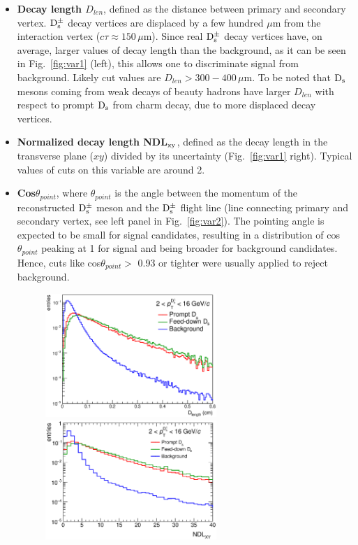 \begin{itemize}
\item \textbf{Decay length $D_{len}$}, defined as the distance between
 primary and secondary vertex. ${\rm D_s^{\pm}}$ decay vertices are displaced by
  a few hundred $\mu$m from the interaction vertex ($c\tau \approx 150\, \mu$m). Since real ${\rm D_s^{\pm}}$ 
  decay vertices have, on average, larger values of decay length than the
   background, as it can be seen in Fig.~\ref{fig:var1} (left), 
   this allows one to discriminate signal from background. 
   Likely cut values are $D_{len} > 300-400\, \mu $m. 
   To be noted that ${\rm D_s}$ mesons coming from weak decays of beauty hadrons have larger $D_{len}$
   with respect to prompt ${\rm D_s}$ from charm decay, due to more displaced decay vertices.
\item \textbf{Normalized decay length NDL$_{\rm xy}$}, defined as the decay length 
in the transverse plane ($xy$) divided by its uncertainty (Fig.~\ref{fig:var1} right).
Typical values of cuts on this variable are around 2.
\item \textbf{Cos$\theta_{point}$}, where $\theta_{point}$ is the angle
 between the momentum of the reconstructed ${\rm D_s^{\pm}}$ meson and the 
 ${\rm D_s^{\pm}}$ flight line (line connecting primary and secondary vertex, see
  left panel in Fig.~\ref{fig:var2}). The pointing angle is expected to be small for signal 
  candidates, resulting in a distribution of cos$\theta_{point}$ peaking at 1 for 
  signal and being broader for background candidates. Hence, cuts like 
  cos$\theta_{point} >$ 0.93 or tighter were usually applied to reject background.
\begin{figure}[!t]
\centering
\includegraphics[width=6.5cm]{FigCap4/DL.eps}
\includegraphics[width=6.5cm]{FigCap4/NDLxy.eps}

\end{figure}
\end{itemize}
